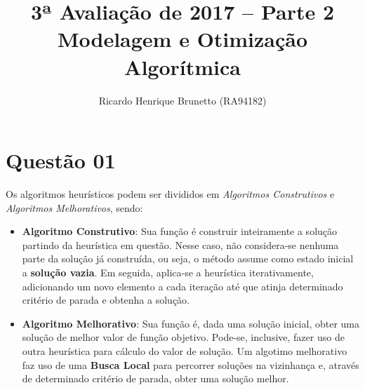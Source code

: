 

\sloppy

\title{3ª Avaliação de 2017 – Parte 2\\Modelagem e Otimização Algorítmica}

\author{Ricardo Henrique Brunetto (RA94182)}


\address{Departamento de Informática -- Universidade Estadual de Maringá (UEM)\\
	Maringá -- PR -- Brasil
}



	\maketitle


  \section*{Questão 01}
	Os algoritmos heurísticos podem ser divididos em \textit{Algoritmos Construtivos} e \textit{Algoritmos Melhorativos},
	sendo:
	\begin{itemize}
		\item \textbf{Algoritmo Construtivo}: Sua função é construir inteiramente a solução
		partindo da heurística em questão. Nesse caso, não considera-se nenhuma parte da solução
		já construída, ou seja, o método assume como estado inicial a \textbf{solução vazia}.
		Em seguida, aplica-se a heurística iterativamente, adicionando um novo elemento a
		cada iteração até que atinja determinado critério de parada e obtenha a solução.

		\item \textbf{Algoritmo Melhorativo}: Sua função é, dada uma solução inicial,
		obter uma solução de melhor valor de função objetivo. Pode-se, inclusive, fazer uso
		de outra heurística para cálculo do valor de solução. Um algotimo melhorativo
		faz uso de uma \textbf{Busca Local} para percorrer soluções na vizinhança
		e, através de determinado critério de parada, obter uma solução melhor.
	\end{itemize}

